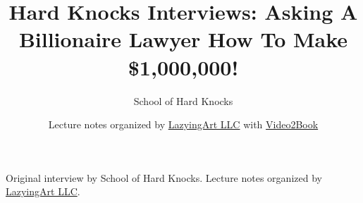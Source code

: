 \documentclass[11pt,oneside]{book}
\begin{document}
\frontmatter
\title{Hard Knocks Interviews: Asking A Billionaire Lawyer How To Make \$1,000,000!}
\author{School of Hard Knocks}
\date{Lecture notes organized by \href{https://lazying.art}{LazyingArt LLC} with \href{https://github.com/lachlanchen/Video2Book}{Video2Book}}
\maketitle
\begin{center}
\small Original interview by School of Hard Knocks. Lecture notes organized by \href{https://lazying.art}{LazyingArt LLC}.
\end{center}
\clearpage
\mainmatter

\end{document}
